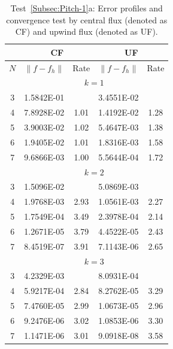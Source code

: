 \documentclass[preprint,11pt]{elsarticle}
\begin{document}
{\small
\begin{table}[H]
\caption{Test~\ref{Subsec:Pitch-1}a: Error profiles and convergence test by central flux (denoted as CF) and upwind flux (denoted as UF).}\label{Tab:Pitch_E-1}
\centering
\begin{tabular}{c|cc|cc}	\hline\hline
& \multicolumn{2}{c|}{CF} &\multicolumn{2}{c}{UF}\\ \hline
$N$ & $\|f-f_h\|$ & Rate & $\|f-f_h\|$ & Rate \\ \hline		
&\multicolumn{4}{c}{$k=1$}\\ \hline
3	&1.5842E-01	&	        &3.4551E-02	& \\
4	&7.8928E-02	&1.01	&1.4192E-02	&1.28\\
5	&3.9003E-02	&1.02	&5.4647E-03	&1.38\\
6	&1.9405E-02	&1.01	&1.8316E-03	&1.58\\
7	&9.6866E-03	&1.00	&5.5644E-04	&1.72\\ \hline
			&\multicolumn{4}{c}{$k=2$}\\ \hline	
3	&1.5096E-02	&	&5.0869E-03	& \\
4	&1.9768E-03	&2.93	&1.0561E-03	&2.27\\
5	&1.7549E-04	&3.49	&2.3978E-04	&2.14\\
6	&1.2671E-05	&3.79	&4.4522E-05	&2.43\\
7	&8.4519E-07	&3.91	&7.1143E-06	&2.65\\ \hline
			&\multicolumn{4}{c}{$k=3$}\\ \hline	
3	&4.2329E-03	&	&8.0931E-04	& \\
4	&5.9217E-04	&2.84	&8.2762E-05	&3.29\\ 
5	&7.4760E-05	&2.99	&1.0673E-05	&2.96\\
6	&9.2476E-06	&3.02	&1.0853E-06	&3.30\\ 
7	&1.1471E-06	&3.01	&9.0918E-08	&3.58\\ \hline\hline
\end{tabular}
\end{table}
}
\end{document}
